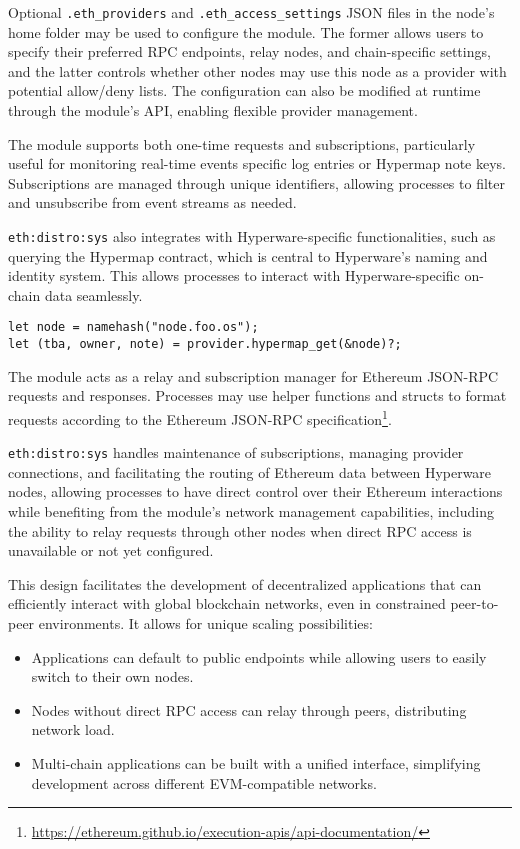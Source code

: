 \documentclass[runningheads]{llncs}
\begin{document}
Optional \verb|.eth_providers| and \verb|.eth_access_settings| JSON files in the node's home folder may be used to configure the module. The former allows users to specify their preferred RPC endpoints, relay nodes, and chain-specific settings, and the latter controls whether other nodes may use this node as a provider with potential allow/deny lists. The configuration can also be modified at runtime through the module's API, enabling flexible provider management.

The module supports both one-time requests and subscriptions, particularly useful for monitoring real-time events specific log entries or Hypermap note keys. Subscriptions are managed through unique identifiers, allowing processes to filter and unsubscribe from event streams as needed.

\verb|eth:distro:sys| also integrates with Hyperware-specific functionalities, such as querying the Hypermap contract, which is central to Hyperware's naming and identity system. This allows processes to interact with Hyperware-specific on-chain data seamlessly.

\begin{verbatim}
let node = namehash("node.foo.os");
let (tba, owner, note) = provider.hypermap_get(&node)?;
\end{verbatim}

The module acts as a relay and subscription manager for Ethereum JSON-RPC requests and responses. Processes may use helper functions and structs to format requests according to the Ethereum JSON-RPC specification\footnote{\url{https://ethereum.github.io/execution-apis/api-documentation/}}.

\verb|eth:distro:sys| handles maintenance of subscriptions, managing provider connections, and facilitating the routing of Ethereum data between Hyperware nodes, allowing processes to have direct control over their Ethereum interactions while benefiting from the module's network management capabilities, including the ability to relay requests through other nodes when direct RPC access is unavailable or not yet configured.

This design facilitates the development of decentralized applications that can efficiently interact with global blockchain networks, even in constrained peer-to-peer environments. It allows for unique scaling possibilities:

\begin{itemize}
	\item Applications can default to public endpoints while allowing users to easily switch to their own nodes.
	\item Nodes without direct RPC access can relay through peers, distributing network load.
	\item Multi-chain applications can be built with a unified interface, simplifying development across different EVM-compatible networks.
\end{itemize}
\end{document}
